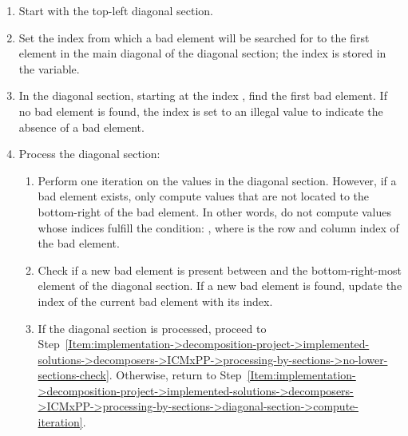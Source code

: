 \begin{enumerate}
	\item \label{Item:implementation->decomposition-project->implemented-solutions->decomposers->ICMxPP->processing-by-sections->diagonal-section->start-at-top-left-diagonal-section}
		Start with the top-left diagonal section.
	\item \label{Item:implementation->decomposition-project->implemented-solutions->decomposers->ICMxPP->processing-by-sections->diagonal-section->reset-previous-bad-element}
		Set the index from which a bad element will be searched for to the first element in the main diagonal of the diagonal section; the index is stored in the  variable. 
	\item \label{Item:implementation->decomposition-project->implemented-solutions->decomposers->ICMxPP->processing-by-sections->diagonal-section->find-first-bad-element}
		In the diagonal section, starting at the index , find the first bad element.
If no bad element is found, the index is set to an illegal value to indicate the absence of a bad element.
	\item \label{Item:implementation->decomposition-project->implemented-solutions->decomposers->ICMxPP->processing-by-sections->diagonal-section->process-diagonal-section}
		Process the diagonal section:
		\begin{enumerate}
			\item \label{Item:implementation->decomposition-project->implemented-solutions->decomposers->ICMxPP->processing-by-sections->diagonal-section->compute-iteration}
				Perform one iteration on the values in the diagonal section.
However, if a bad element exists, only compute values that are not located to the bottom-right of the bad element.
In other words, do not compute values whose indices fulfill the condition: , where  is the row and column index of the bad element.
			\item Check if a new bad element is present between  and the bottom-right-most element of the diagonal section.
If a new bad element is found, update the index of the current bad element with its index.
			\item If the diagonal section is processed, proceed to Step~\ref{Item:implementation->decomposition-project->implemented-solutions->decomposers->ICMxPP->processing-by-sections->no-lower-sections-check}.
Otherwise, return to Step~\ref{Item:implementation->decomposition-project->implemented-solutions->decomposers->ICMxPP->processing-by-sections->diagonal-section->compute-iteration}.

\end{enumerate}
\end{enumerate}
